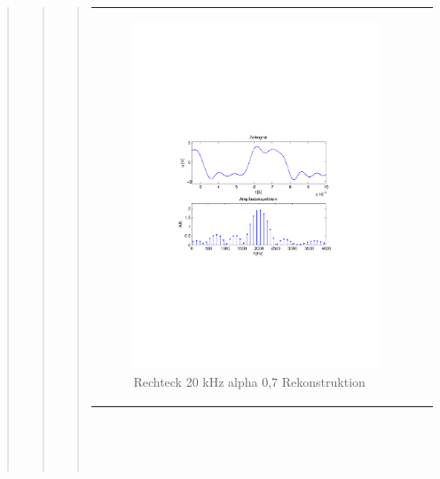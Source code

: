 \begin{quote}
\begin{quote}
\begin{quote}
\begin{center}
\begin{tabular}{ll}
                \begin{minipage}{0.6\textwidth}
                    \begin{figure}[H]
                        \includegraphics[scale=0.55, trim = 16mm 70mm 16mm 85mm, clip]{Bilder/flatrec20_07}
                       \caption{Rechteck 20 kHz alpha 0,7 Rekonstruktion}
		              \label{fig:flatrec20_07}
                    \end{figure}
                \end{minipage}
            
            \end{tabular}
            \end{center}
            \ \\
            \ \\
            \ \\ 
             

\end{quote}
\end{quote}
\end{quote}
